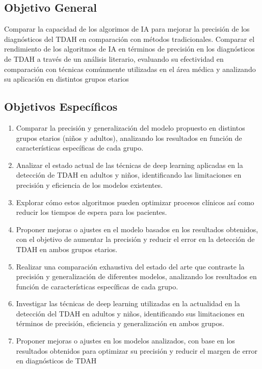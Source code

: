 \documentclass[10pt,journal,compsoc]{IEEEtran}
\begin{document}
\subsection{Objetivo General}
Comparar la capacidad de los algorimos de IA para mejorar la precisión de los diagnósticos del TDAH en comparación con métodos tradicionales.
Comparar el rendimiento de los algoritmos de IA en términos de precisión en los diagnósticos de TDAH a través de un análisis literario, evaluando su efectividad en comparación con técnicas comúnmente utilizadas en el área médica y analizando su aplicación en distintos grupos etarios

\subsection{Objetivos Específicos}
\begin{enumerate}
    \item Comparar la precisión y generalización del modelo propuesto en distintos grupos etarios (niños y adultos), analizando los resultados en función de características específicas de cada grupo.
    \item Analizar el estado actual de las técnicas de deep learning aplicadas en la detección de TDAH en adultos y niños, identificando las limitaciones en precisión y eficiencia de los modelos existentes.
    \item Explorar cómo estos algoritmos pueden optimizar procesos clínicos así como reducir los tiempos de espera para los pacientes.
    \item Proponer mejoras o ajustes en el modelo basados en los resultados obtenidos, con el objetivo de aumentar la precisión y reducir el error en la detección de TDAH en ambos grupos etarios.
    \item Realizar una comparación exhaustiva del estado del arte que contraste la precisión y generalización de diferentes modelos, analizando los resultados en función de características específicas de cada grupo.
    \item Investigar las técnicas de deep learning utilizadas en la actualidad en la detección del TDAH en adultos y niños, identificando sus limitaciones en términos de precisión, eficiencia y generalización en ambos grupos.
    \item Proponer mejoras o ajustes en los modelos analizados, con base en los resultados obtenidos para optimizar su precisión y reducir el margen de error en diagnósticos de TDAH
\end{enumerate}
\end{document}
